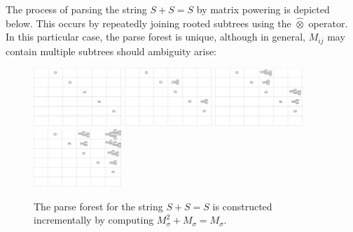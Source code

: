 \documentclass[sigplan,review,anonymous,acmsmall]{acmart}\settopmatter{printfolios=false,printccs=false,printacmref=false}
\begin{document}


The process of parsing the string $S + S = S$ by matrix powering is depicted below. This occurs by repeatedly joining rooted subtrees using the $\hat{\otimes}$ operator. In this particular case, the parse forest is unique, although in general, $M_{ij}$ may contain multiple subtrees should ambiguity arise:

\begin{figure}[H]
    \includegraphics[width=3.305cm]{../figures/parse1.png}
    \includegraphics[width=3.298cm]{../figures/parse2.png}
    \includegraphics[width=3.3cm]{../figures/parse3.png}
    \includegraphics[width=3.32cm]{../figures/parse4.png}
  \caption{The parse forest for the string $S + S = S$ is constructed incrementally by computing $M_\sigma^2 + M_\sigma = M_\sigma$.}%
\end{figure}
\end{document}
